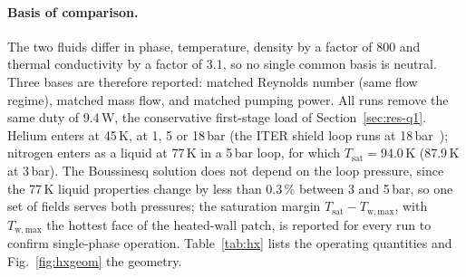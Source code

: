 \documentclass[preprint,12pt]{elsarticle}
\begin{document}
\paragraph{Basis of comparison.} The two fluids differ in phase, temperature, density by a
factor of 800 and thermal conductivity by a factor of 3.1, so no single common basis is
neutral. Three bases are therefore reported: matched Reynolds number (same flow regime),
matched mass flow, and matched pumping power. All runs remove the same duty of 9.4\,W, the
conservative first-stage load of Section~\ref{sec:res-q1}. Helium enters at 45\,K, at 1, 5 or
18\,bar (the ITER shield loop runs at 18\,bar~\cite{Nam2014ITERThermalShield}); nitrogen enters
as a liquid at 77\,K in a 5\,bar loop, for which $T_{\mathrm{sat}}=94.0$\,K (87.9\,K at 3\,bar).
The Boussinesq solution does not depend on the loop pressure, since the 77\,K liquid properties
change by less than 0.3\,\% between 3 and 5\,bar, so one set of fields serves both pressures;
the saturation margin $T_{\mathrm{sat}}-T_{\mathrm{w,max}}$, with $T_{\mathrm{w,max}}$ the hottest
face of the heated-wall patch, is reported for every run to confirm single-phase operation. Table~\ref{tab:hx} lists the operating quantities and Fig.~\ref{fig:hxgeom} the geometry.
\end{document}
